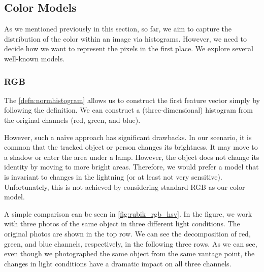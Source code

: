 \subsection{Color Models}

As we mentioned previously in this section, so far, we aim to capture the distribution of the color within an image via histograms. However, we need to decide how we want to represent the pixels in the first place. We explore several well-known models.

\subsubsection{RGB}

The \autoref{defn:normhistogram} allows us to construct the first feature vector simply by following the definition. We can construct a (three-dimensional) histogram from the original channels (red, green, and blue).

However, such a naïve approach has significant drawbacks. In our scenario, it is common that the tracked object or person changes its brightness. It may move to a shadow or enter the area under a lamp. However, the object does not change its identity by moving to more bright areas. Therefore, we would prefer a model that is invariant to changes in the lightning (or at least not very sensitive). Unfortunately, this is not achieved by considering standard RGB as our color model.


A simple comparison can be seen in \autoref{fig:rubik_rgb_hsv}. In the figure, we work with three photos of the same object in three different light conditions. The original photos are shown in the top row. We can see the decomposition of red, green, and blue channels, respectively, in the following three rows. As we can see, even though we photographed the same object from the same vantage point, the changes in light conditions have a dramatic impact on all three channels.

